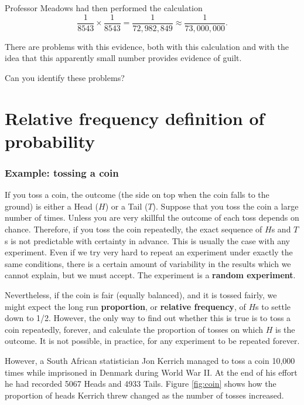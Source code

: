 \documentclass[
  11pt,
  british,
  openany, a4paper]{book}
\begin{document}
Professor Meadows had then performed the calculation
\[\frac{1}{8543}\times\frac{1}{8543}=\frac{1}{72,982,849}\approx\frac{1}{73,000,000}.\]

There are problems with this evidence, both with this calculation and with the idea that this apparently small number provides evidence of guilt.

Can you identify these problems?

\hypertarget{relative-frequency-definition-of-probability}{%
\section{Relative frequency definition of probability}\label{relative-frequency-definition-of-probability}}

\hypertarget{example-tossing-a-coin}{%
\subsubsection*{Example: tossing a coin}\label{example-tossing-a-coin}}

If you toss a coin, the outcome (the side on top when the coin falls to the ground) is either a Head (\(H\)) or a Tail (\(T\)). Suppose that you toss the coin a large number of times. Unless you are very skillful the outcome of each toss depends on chance. Therefore, if you toss the coin repeatedly, the exact sequence of \(H\)s and \(T\)s is not predictable with certainty in advance. This is usually the case with any experiment. Even if we try very hard to repeat an experiment under exactly the same conditions, there is a certain amount of variability in the results which we cannot explain, but we must accept. The experiment is a
\textbf{random experiment}.

Nevertheless, if the coin is fair (equally balanced), and it is tossed fairly, we might expect the long run \textbf{proportion}, or \textbf{relative frequency}, of \(H\)s to settle down to 1/2. However, the only way to find out whether this is true is to toss a coin repeatedly, forever, and calculate the proportion of tosses on which \(H\) is the outcome. It is not possible, in practice, for any experiment to be repeated forever.

However, a South African statistician Jon Kerrich managed to toss a coin
10,000 times while imprisoned in Denmark during World War II. At the end of his
effort he had recorded 5067 Heads and 4933 Tails. Figure \ref{fig:coin} shows
how the proportion of heads Kerrich threw changed as the number of tosses increased.
\end{document}
